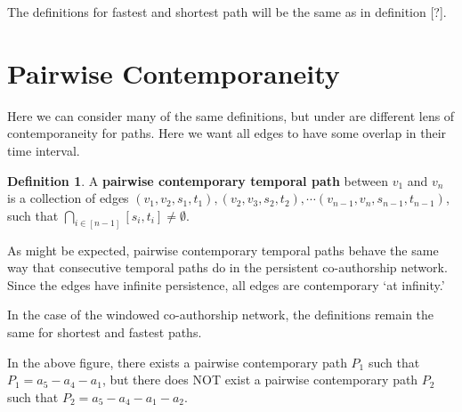 \documentclass{article}
\theoremstyle{definition}
\newtheorem{defn}[thm]{Definition}
\numberwithin{thm}{subsection}
\begin{document}
The definitions for fastest and shortest path will be the same as in definition
[?].


\section{Pairwise Contemporaneity}

Here we can consider many of the same definitions, but under are different
lens of contemporaneity for paths. Here we want all edges to have some overlap
in their time interval.

\begin{defn}
  A \textbf{pairwise contemporary temporal path} between $v_1$ and $v_n$ is a
  collection of edges $(v_1,v_2,s_1,t_1), (v_2,v_3,s_2,t_2), \cdots (v_{n-1},
  v_n,s_{n-1}, t_{n-1})$, such that $\bigcap_{i \in [n-1]} [s_i, t_i]
  \neq \emptyset$.
\end{defn}

As might be expected, pairwise contemporary temporal paths behave the same way
that consecutive temporal paths do in the persistent co-authorship network.
Since the edges have infinite persistence, all edges are contemporary `at
infinity.'

In the case of the windowed co-authorship network, the definitions remain the
same for shortest and fastest paths.

\begin{center}
\end{center}

In the above figure, there exists a pairwise contemporary path $P_1$ such that
$P_1 = a_5-a_4-a_1$, but there does NOT exist a pairwise contemporary path
$P_2$ such that $P_2 = a_5-a_4-a_1-a_2$.
\end{document}
